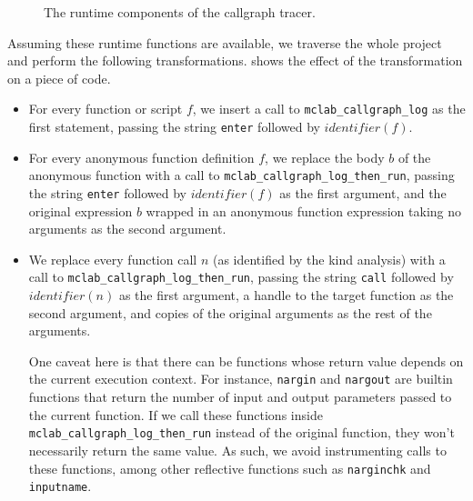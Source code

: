 \begin{figure}

\caption{The runtime components of the callgraph tracer.}
\label{Fig:CallgraphRuntime}
\end{figure}

Assuming these runtime functions are available, we traverse the whole project
and perform the following transformations.  shows
the effect of the transformation on a piece of \matlab code.

\begin{itemize}

\item For every function or script $f$, we insert a call to
  \texttt{mclab\_callgraph\_log} as the first statement, passing the string
  \texttt{enter} followed by $identifier(f)$.

\item For every anonymous function definition $f$, we replace the body $b$ of the
  anonymous function with a call to \texttt{mclab\_callgraph\_log\_then\_run},
  passing the string \texttt{enter} followed by $identifier(f)$ as the first
  argument, and the original expression $b$ wrapped in an anonymous function
  expression taking no arguments as the second argument.

\item We replace every function call $n$ (as identified by the kind analysis)
  with a call to \texttt{mclab\_callgraph\_log\_then\_run}, passing the string
  \texttt{call} followed by $identifier(n)$ as the first argument, a handle to
  the target function as the second argument, and copies of the original
  arguments as the rest of the arguments.

  One caveat here is that there can be functions whose return value
  depends on the current execution context. For instance, \texttt{nargin} and
  \texttt{nargout} are builtin functions that return the number of input and
  output parameters passed to the current function. If we call these functions
  inside \texttt{mclab\_callgraph\_log\_then\_run} instead of the original
  function, they won't necessarily return the same value. As such, we avoid
  instrumenting calls to these functions, among other reflective functions such
  as \texttt{narginchk} and \texttt{inputname}.


\end{itemize}
